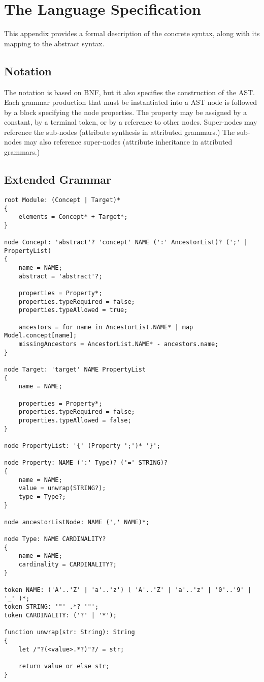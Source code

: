 \section{The Language Specification}\label{sec:spec}
%
This appendix provides a formal description of the concrete syntax, along with its mapping to the abstract syntax.

\subsection{Notation}

The notation is based on BNF, but it also specifies the construction of the AST. Each grammar production that must be instantiated into a AST node is followed by a block specifying the node properties. The property may be assigned by a constant, by a terminal token, or by a reference to other nodes. Super-nodes may reference the sub-nodes (attribute synthesis in attributed grammars.) The sub-nodes may also reference super-nodes (attribute inheritance in attributed grammars.) 

\subsection{Extended Grammar}

\verbatimfont{\tiny}
\begin{verbatim}
root Module: (Concept | Target)*
{
    elements = Concept* + Target*;
}

node Concept: 'abstract'? 'concept' NAME (':' AncestorList)? (';' | PropertyList)
{
    name = NAME;
    abstract = 'abstract'?;

    properties = Property*;
    properties.typeRequired = false;
    properties.typeAllowed = true;

    ancestors = for name in AncestorList.NAME* | map Model.concept[name];
    missingAncestors = AncestorList.NAME* - ancestors.name;
}

node Target: 'target' NAME PropertyList
{
    name = NAME;

    properties = Property*;
    properties.typeRequired = false;
    properties.typeAllowed = false;
}

node PropertyList: '{' (Property ';')* '}';

node Property: NAME (':' Type)? ('=' STRING)?
{
    name = NAME;
    value = unwrap(STRING?);
    type = Type?;
}

node ancestorListNode: NAME (',' NAME)*;

node Type: NAME CARDINALITY?
{
    name = NAME;
    cardinality = CARDINALITY?;
}

token NAME: ('A'..'Z' | 'a'..'z') ( 'A'..'Z' | 'a'..'z' | '0'..'9' | '_' )*;
token STRING: '"' .*? '"';
token CARDINALITY: ('?' | '*');

function unwrap(str: String): String
{
    let /"?(<value>.*?)"?/ = str;

    return value or else str;
}
\end{verbatim}
